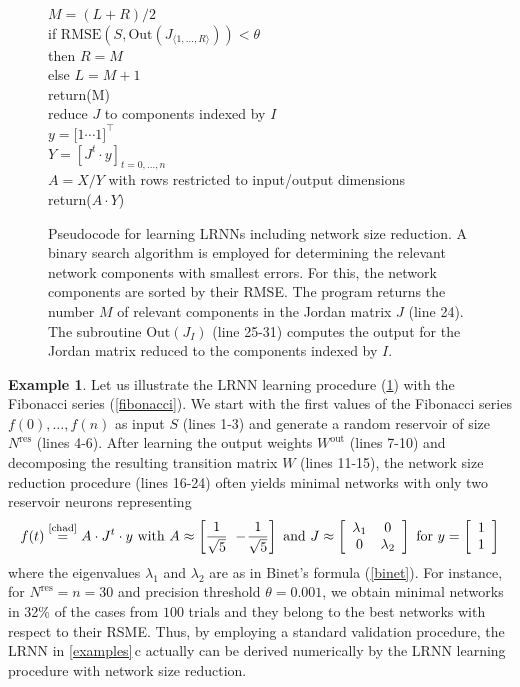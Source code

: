 \documentclass[twoside,11pt]{article}
\theoremstyle{definition}
\newtheorem{exmp}{Example}
\begin{document}
\begin{figure}
\begin{algorithmic}[1]
        \quad $M = (L+R)/2$\\
        \quad if $\mathrm{RMSE}(S,\mathrm{Out}(J_{\langle 1,\dots,R \rangle}))<\theta$\\
        \qquad then $R = M$\\
        \qquad else $L = M+1$\\
        return(M)\newline
        \\
        reduce $J$ to components indexed by $I$\\
	$y = \big[ 1 \cdots 1 \big]^\top$\\
	$Y = \left[J^t \cdot y\right]_{t=0,\dots,n}$\\
        $A = X/Y$ with rows restricted to input/output dimensions\\
	return($A \cdot Y$)        
\end{algorithmic}
\caption{Pseudocode for learning LRNNs including network size reduction. A
binary search algorithm is employed for determining the relevant network
components with smallest errors. For this, the network components are sorted by
their RMSE. The program returns the number $M$ of relevant components in the Jordan matrix $J$ (line 24).
The subroutine $\mathrm{Out}(J_I)$ (line 25-31) computes the output for the
Jordan matrix reduced to the components indexed by $I$.}
\label{proc}
\end{figure}

\begin{exmp}\label{continued}
Let us illustrate the LRNN learning procedure (\cref{proc}) with the Fibonacci
series (\cref{fibonacci}). We start with the first values of the Fibonacci
series $f(0),\dots,f(n)$ as input $S$ (lines 1-3) and generate a random
reservoir of size $N^\mathrm{res}$ (lines 4-6). After learning the output
weights $W^\mathrm{out}$ (lines 7-10) and decomposing the resulting transition
matrix $W$ (lines 11-15), the network size reduction procedure (lines 16-24)
often yields minimal networks with only two reservoir neurons representing
\[
    f(t) \overset{\text{\cref{chad}}}{=} A \cdot J^t \cdot y \text{~with~}
	A \approx \left[ \frac{1}{\sqrt{5}} ~ -\!\frac{1}{\sqrt{5}} \right] \text{~and~}
	J \approx \left[ \begin{array}{cc}
		\lambda_1 & 0\\
		0 & \lambda_2
   	\end{array} \right] \text{~for~}
	y = \left[ \begin{array}{c}
	1\\
	1
   \end{array} \right]
\]
where the eigenvalues $\lambda_1$ and $\lambda_2$ are as in Binet's formula
(\cref{binet}). For instance, for $N^\mathrm{res}=n=30$ and precision threshold
$\theta=0.001$, we obtain minimal networks in 32\% of the cases from $100$
trials and they belong to the best networks with respect to their RSME. Thus,
by employing a standard validation procedure, the LRNN in \cref{examples}\,c
actually can be derived numerically by the LRNN learning procedure with network
size reduction.
\end{exmp}
\end{document}
